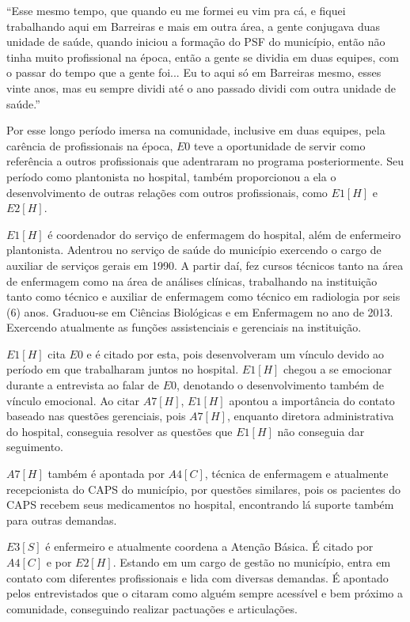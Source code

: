 \begin{citacao}
``Esse mesmo tempo, que quando eu me formei eu vim pra cá, e fiquei trabalhando aqui em Barreiras e mais em outra área, a gente conjugava duas unidade de saúde, quando iniciou a formação do PSF do município, então não tinha muito profissional na época, então a gente se dividia em duas equipes, com o passar do tempo que a gente foi... Eu to aqui só em Barreiras mesmo, esses vinte anos, mas eu sempre dividi até o ano passado dividi com outra unidade de saúde.''
\end{citacao}

Por esse longo período imersa na comunidade, inclusive em duas equipes, pela carência de profissionais na época, $E0$ teve a oportunidade de servir como referência a outros profissionais que adentraram no programa posteriormente. Seu período como plantonista no hospital, também proporcionou a ela o desenvolvimento de outras relações com outros profissionais, como $E1 [H]$ e $E2 [H]$.

$E1[H]$ é coordenador do serviço de enfermagem do hospital, além de enfermeiro plantonista. Adentrou no serviço de saúde do município exercendo o cargo de auxiliar de serviços gerais em 1990. A partir daí, fez cursos técnicos tanto na área de enfermagem como na área de análises clínicas, trabalhando na instituição tanto como técnico e auxiliar de enfermagem como técnico em radiologia por seis (6) anos. Graduou-se em Ciências Biológicas e em Enfermagem no ano de 2013. Exercendo atualmente as funções assistenciais e gerenciais na instituição.

$E1[H]$ cita $E0$ e é citado por esta, pois desenvolveram um vínculo devido ao período em que trabalharam juntos no hospital. $E1[H]$ chegou a se emocionar durante a entrevista ao falar de $E0$, denotando o desenvolvimento também de vínculo emocional. Ao citar $A7[H]$, $E1[H]$ apontou a importância do contato baseado nas questões gerenciais, pois $A7[H]$, enquanto diretora administrativa do hospital, conseguia resolver as questões que $E1[H]$ não conseguia dar seguimento.

$A7[H]$ também é apontada por $A4[C]$, técnica de enfermagem e atualmente recepcionista do \acrshort{CAPS} do município, por questões similares, pois os pacientes do CAPS recebem seus medicamentos no hospital, encontrando lá suporte também para outras demandas. 

$E3[S]$ é enfermeiro e atualmente coordena a Atenção Básica. É citado por $A4[C]$ e por $E2[H]$. Estando em um cargo de gestão no município, entra em contato com diferentes profissionais e lida com diversas demandas. É apontado pelos entrevistados que o citaram como alguém sempre acessível e bem próximo a comunidade, conseguindo realizar pactuações e articulações.

